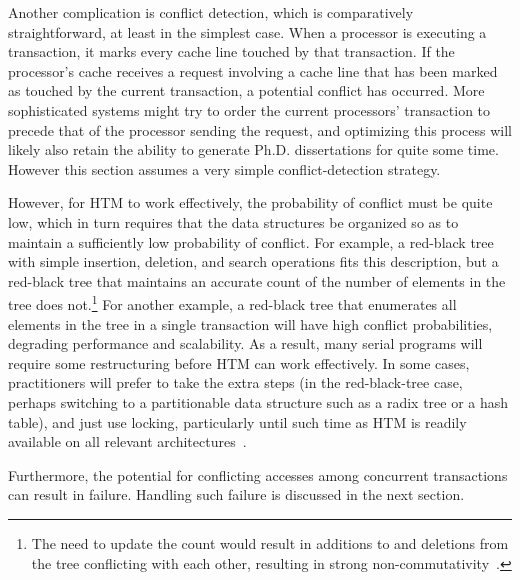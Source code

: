 Another complication is conflict detection, which is comparatively
straightforward, at least in the simplest case.
When a processor is executing a transaction, it marks every cache line
touched by that transaction.
If the processor's cache receives a request involving a cache line that
has been marked as touched by the current transaction, a potential
conflict has occurred.
More sophisticated systems might try to order the current processors'
transaction to precede that of the processor sending the request, and
optimizing this process will likely also retain the ability to generate
Ph.D. dissertations for quite some time.
However this section assumes a very simple conflict-detection strategy.

However, for HTM to work effectively, the probability of conflict must
be quite low, which in turn requires that the data structures
be organized so as to maintain a sufficiently low probability of conflict.
For example, a red-black tree with simple insertion, deletion, and search
operations fits this description, but a red-black
tree that maintains an accurate count of the number of elements in
the tree does not.\footnote{
	The need to update the count would result in additions to and
	deletions from the tree conflicting with each other, resulting
	in strong non-commutativity~\cite{HagitAttiya2011LawsOfOrder,Attiya:2011:LOE:1925844.1926442,PaulEMcKenney2011SNC}.}
For another example, a red-black tree that enumerates all elements in
the tree in a single transaction will have high conflict probabilities,
degrading performance and scalability.
As a result, many serial programs will require some restructuring before
HTM can work effectively.
In some cases, practitioners will prefer to take the extra steps
(in the red-black-tree case, perhaps switching to a partitionable
data structure such as a radix tree or a hash table), and just
use locking, particularly until such time as HTM is readily available
on all relevant
architectures~\cite{CliffClick2009AzulHTM}.

\QuickQuizEnd

Furthermore, the potential for conflicting accesses among concurrent
transactions can result in failure.
Handling such failure is discussed in the next section.

